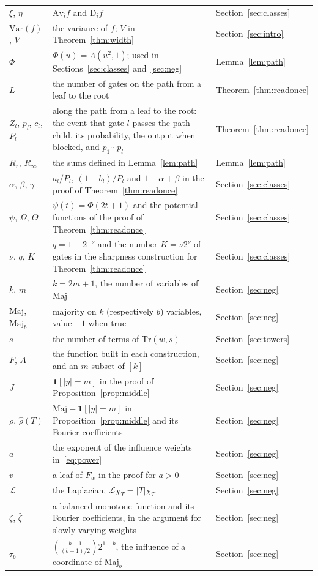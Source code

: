 \documentclass[11pt]{amsart}
\theoremstyle{definition}
\theoremstyle{remark}
\begin{document}
\begin{longtable}{@{}>{\raggedright\arraybackslash}p{}>{\raggedright\arraybackslash}p{}>{\raggedright\arraybackslash}p{}@{}}
$\xi$, $\eta$ & $\mathrm{Av}_if$ and $\mathrm D_if$ & Section~\ref{sec:classes} \\
$\mathrm{Var}(f)$, $V$ & the variance of $f$; $V$ in Theorem~\ref{thm:width} & Section~\ref{sec:intro} \\
$\Phi$ & $\Phi(u)=\Lambda(u^2,1)$; used in Sections~\ref{sec:classes} and~\ref{sec:neg} & Lemma~\ref{lem:path} \\
$L$ & the number of gates on the path from a leaf to the root & Theorem~\ref{thm:readonce} \\
$Z_l$, $p_l$, $c_l$, $P_l$ & along the path from a leaf to the root: the event that gate $l$ passes the path child, its probability, the output when blocked, and $p_1\cdots p_l$ & Theorem~\ref{thm:readonce} \\
$R_r$, $R_\infty$ & the sums defined in Lemma~\ref{lem:path} & Lemma~\ref{lem:path} \\
$\alpha$, $\beta$, $\gamma$ & $a_l/P_l$, $(1-b_l)/P_l$ and $1+\alpha+\beta$ in the proof of Theorem~\ref{thm:readonce} & Section~\ref{sec:classes} \\
$\psi$, $\Omega$, $\Theta$ & $\psi(t)=\Phi(2t+1)$ and the potential functions of the proof of Theorem~\ref{thm:readonce} & Section~\ref{sec:classes} \\
$\nu$, $q$, $K$ & $q=1-2^{-\nu}$ and the number $K=\nu2^\nu$ of gates in the sharpness construction for Theorem~\ref{thm:readonce} & Section~\ref{sec:classes} \\
$k$, $m$ & $k=2m+1$, the number of variables of $\mathrm{Maj}$ & Section~\ref{sec:neg} \\
$\mathrm{Maj}$, $\mathrm{Maj}_b$ & majority on $k$ (respectively $b$) variables, value $-1$ when true & Section~\ref{sec:neg} \\
$s$ & the number of terms of $\mathrm{Tr}(w,s)$ & Section~\ref{sec:towers} \\
$F$, $A$ & the function built in each construction, and an $m$-subset of $[k]$ & Section~\ref{sec:neg} \\
$J$ & $\mathbf 1[|y|=m]$ in the proof of Proposition~\ref{prop:middle} & Section~\ref{sec:neg} \\
$\rho$, $\hat\rho(T)$ & $\mathrm{Maj}-\mathbf 1[|y|=m]$ in Proposition~\ref{prop:middle} and its Fourier coefficients & Section~\ref{sec:neg} \\
$a$ & the exponent of the influence weights in~\eqref{eq:power} & Section~\ref{sec:neg} \\
$v$ & a leaf of $F_w$ in the proof for $a>0$ & Section~\ref{sec:neg} \\
$\mathcal L$ & the Laplacian, $\mathcal L\chi_T=|T|\chi_T$ & Section~\ref{sec:neg} \\
$\zeta$, $\hat\zeta$ & a balanced monotone function and its Fourier coefficients, in the argument for slowly varying weights & Section~\ref{sec:neg} \\
$\tau_b$ & $\binom{b-1}{(b-1)/2}2^{1-b}$, the influence of a coordinate of $\mathrm{Maj}_b$ & Section~\ref{sec:neg} \\
\bottomrule
\end{longtable}
\end{document}

